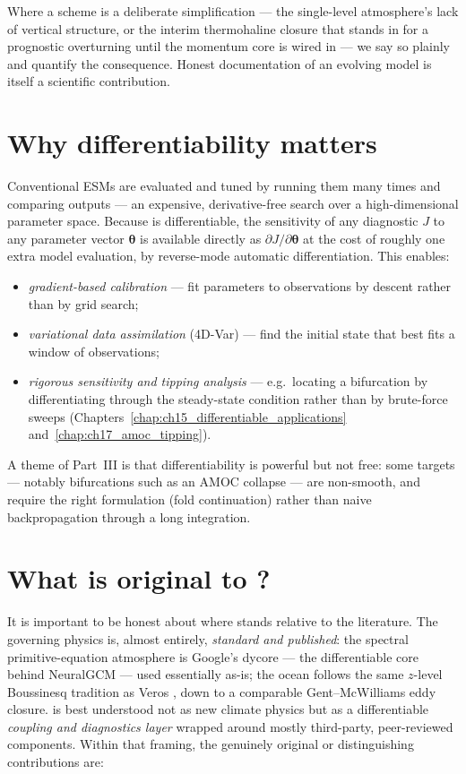 
\noindent
Where a scheme is a deliberate simplification --- the single-level atmosphere's lack of vertical
structure, or the interim thermohaline closure that stands in for a prognostic overturning until
the momentum core is wired in --- we say so plainly and quantify the consequence. Honest
documentation of an evolving model is itself a scientific contribution.

\section{Why differentiability matters}

Conventional ESMs are evaluated and tuned by running them many times and comparing outputs ---
an expensive, derivative-free search over a high-dimensional parameter space. Because \model{}
is differentiable, the sensitivity of any diagnostic $J$ to any parameter vector
$\boldsymbol{\theta}$ is available directly as $\partial J/\partial\boldsymbol{\theta}$ at the
cost of roughly one extra model evaluation, by reverse-mode automatic differentiation. This
enables:
\begin{itemize}[leftmargin=1.4em]
  \item \emph{gradient-based calibration} --- fit parameters to observations by descent rather
    than by grid search;
  \item \emph{variational data assimilation} (4D-Var) --- find the initial state that best fits
    a window of observations;
  \item \emph{rigorous sensitivity and tipping analysis} --- e.g.\ locating a bifurcation by
    differentiating through the steady-state condition rather than by brute-force sweeps
    (Chapters~\ref{chap:ch15_differentiable_applications} and~\ref{chap:ch17_amoc_tipping}).
\end{itemize}
A theme of Part~III is that differentiability is powerful but not free: some targets --- notably
bifurcations such as an AMOC collapse --- are non-smooth, and require the right formulation
(fold continuation) rather than naive backpropagation through a long integration.

\section{What is original to \model{}?}
\label{sec:original_contributions}

It is important to be honest about where \model{} stands relative to the literature. The
governing physics is, almost entirely, \emph{standard and published}: the spectral
primitive-equation atmosphere is Google's \dino{} dycore --- the differentiable core behind
NeuralGCM \citep{kochkov2024neuralgcm} --- used essentially as-is; the ocean follows the same
$z$-level Boussinesq tradition as Veros \citep{hafner2018veros}, down to a comparable
Gent--McWilliams eddy closure. \model{} is best understood not as new climate physics but as a
differentiable \emph{coupling and diagnostics layer} wrapped around mostly third-party,
peer-reviewed components. Within that framing, the genuinely original or distinguishing
contributions are:

